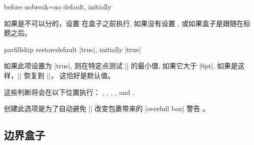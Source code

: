   \begin{docTcbKey}[][doc new=2014-12-16]{before nobreak}{=}{no default, initially }
  
  如果是不可以分的，设置  在盒子之前执行, 如果没有设置  , 或如果盒子是跟随在标题之后。
  \end{docTcbKey}

  

\begin{docTcbKey}[][doc new=2017-02-23]{parfillskip restore}{}{default |true|, initially |true|}

如果此项设置为 |true|, 则在特定点测试 |\parfillskip| 的最小值, 如果它大于 |0pt|.
如果是这样，|\parfillskip| 恢复到 |\@flushglue|， 这恰好是默认值。

这些判断将会在以下位置执行：
  ,
  ,
  ,
  , and
  .


创建此选项是为了自动避免 |\parfillskip| 改变包裹带来的 |overfull box| 警告 。
\end{docTcbKey}




\subsection{边界盒子}

